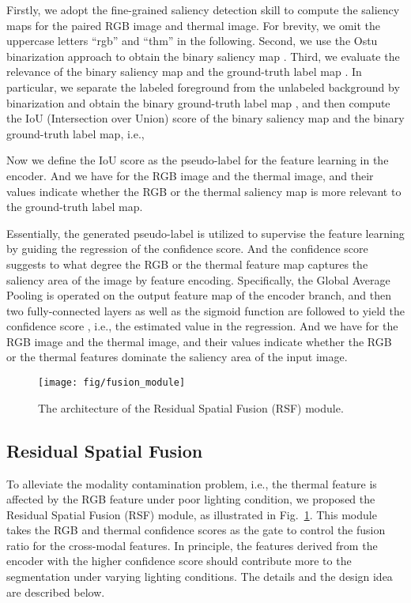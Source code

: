 \documentclass[10.5pt,twocolumn,journal,letterpaper]{IEEEtran}
\newcommand{\ie}{i.e.}
\begin{document}
Firstly, we adopt the fine-grained saliency detection skill \cite{montabone-ivc2010-human} to compute the saliency maps  for the paired RGB image and thermal image. For brevity, we omit the uppercase letters ``rgb'' and ``thm'' in the following. Second, we use the Ostu binarization approach \cite{otsu-tsmc1979-ostu} to obtain the binary saliency map . Third, we evaluate the relevance of the binary saliency map and the ground-truth label map . In particular, we separate the labeled foreground from the unlabeled background by binarization and obtain the binary ground-truth label map , and then compute the IoU (Intersection over Union) score of the binary saliency map and the binary ground-truth label map, \ie,

Now we define the IoU score as the pseudo-label for the feature learning in the encoder. And we have  for the RGB image and the thermal image, and their values indicate whether the RGB or the thermal saliency map is more relevant to the ground-truth label map.

Essentially, the generated pseudo-label is utilized to supervise the feature learning by guiding the regression of the confidence score. And the confidence score suggests to what degree the RGB or the thermal feature map captures the saliency area of the image by feature encoding. Specifically, the Global Average Pooling  is operated on the output feature map of the encoder branch, and then two fully-connected layers  as well as the sigmoid function  are followed to yield the confidence score , \ie, the estimated value in the regression. And we have  for the RGB image and the thermal image, and their values indicate whether the RGB or the thermal features dominate the saliency area of the input image. 

\begin{figure}[!t]
	\centering
	\texttt{[image: fig/fusion\_module]}
	\caption{The architecture of the Residual Spatial Fusion (RSF) module.}
	\label{fig:fusion_module}
\end{figure}

\subsection{Residual Spatial Fusion}
To alleviate the modality contamination problem, \ie, the thermal feature is affected by the RGB feature under poor lighting condition, we proposed the Residual Spatial Fusion (RSF) module, as illustrated in Fig.~\ref{fig:fusion_module}. This module takes the RGB and thermal confidence scores  as the gate to control the fusion ratio for the cross-modal features. In principle, the features derived from the encoder with the higher confidence score should contribute more to the segmentation under varying lighting conditions. The details and the design idea are described below.
\end{document}
